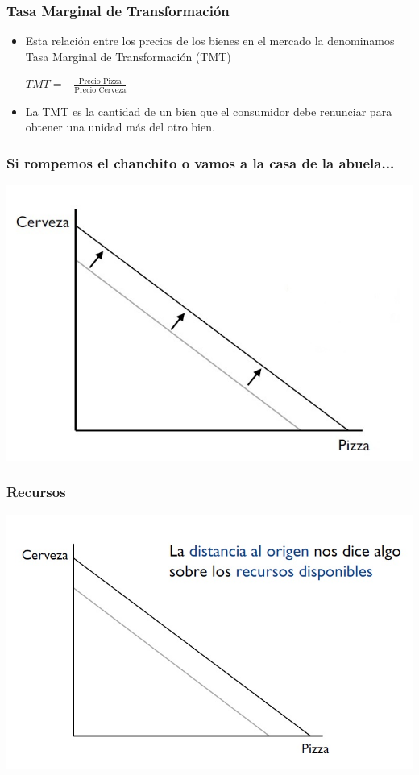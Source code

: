 \documentclass{beamer}
\begin{document}
\begin{frame}
\frametitle{Tasa Marginal de Transformación}
\begin{itemize}
    \item Esta relación entre los precios de los bienes en el mercado la denominamos Tasa Marginal de Transformación (TMT)
    
    \begin{center}
      $TMT = - \frac{\text{Precio Pizza}}{\text{Precio Cerveza}}$
    \end{center}
    
    \item La TMT es la cantidad de un bien que el consumidor debe renunciar para obtener una unidad más del otro bien.
    
\end{itemize} 
\end{frame}

\begin{frame}
\frametitle{Si rompemos el chanchito o vamos a la casa de la abuela...}
\centering
\includegraphics[scale=0.55]{../Figures/Tema_02.9_rp7.jpg}
\end{frame}

\begin{frame}
\frametitle{Recursos}
\centering
\includegraphics[scale=0.55]{../Figures/Tema_02.10_rp8.jpg}
\end{frame}
\end{document}
